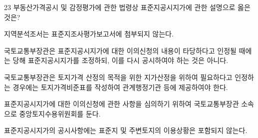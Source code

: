 \begin{question}{23}
부동산가격공시 및 감정평가에 관한 법령상 표준지공시지가에 관한 설명으로 옳은 것은?
\begin{choices}
  \item 지역분석조서는 표준지조사평가보고서에 첨부되지 않는다.
  \item 국토교통부장관은 표준지공시지가에 대한 이의신청의 내용이 타당하다고 인정될 때에는 당해 표준지공시지가를 조정하되, 이를 다시 공시하여야 하는 것은 아니다.
  \item 국토교통부장관은 토지가격 산정의 목적을 위한 지가산정을 위하여 필요하다고 인정하는 경우에는 토지가격비준표를 작성하여 관계행정기관 등에 제공하여야 한다.
  \item 표준지공시지가에 대한 이의신청에 관한 사항을 심의하기 위하여 국토교통부장관 소속으로 중앙토지수용위원회를 둔다.
  \item 표준지공시지가의 공시사항에는 표준지 및 주변토지의 이용상황은 포함되지 않는다.
\end{choices}
\end{question}
